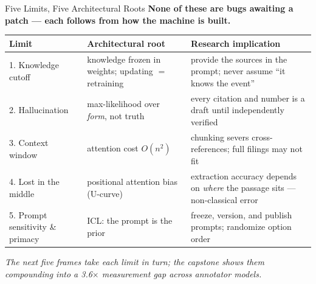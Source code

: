 \begin{frame}{Five Limits, Five Architectural Roots}
\textbf{None of these are bugs awaiting a patch --- each follows from how the machine is built.}
\begin{center}
\renewcommand{\arraystretch}{1.35}
\footnotesize
\begin{tabular}{p{3.0cm} p{4.3cm} p{4.9cm}}
\toprule
\textbf{Limit} & \textbf{Architectural root} & \textbf{Research implication} \\
\midrule
1. Knowledge cutoff & knowledge frozen in weights; updating $=$ retraining & provide the sources in the prompt; never assume ``it knows the event'' \\
2. Hallucination & max-likelihood over \emph{form}, not truth & every citation and number is a draft until independently verified \\
3. Context window & attention cost $O(n^2)$ & chunking severs cross-references; full filings may not fit \\
4. Lost in the middle & positional attention bias (U-curve) & extraction accuracy depends on \emph{where} the passage sits --- non-classical error \\
5. Prompt sensitivity \& primacy & ICL: the prompt is the prior & freeze, version, and publish prompts; randomize option order \\
\bottomrule
\end{tabular}
\end{center}
\smallskip
\textit{\footnotesize The next five frames take each limit in turn; the capstone shows them compounding into a 3.6$\times$ measurement gap across annotator models.}
\end{frame}

